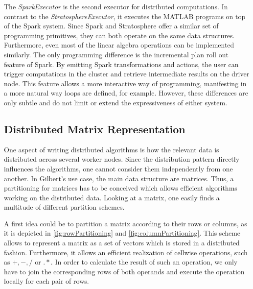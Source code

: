 The \emph{SparkExecutor} is the second executor for distributed computations.
In contrast to the \emph{StratosphereExecutor}, it executes the MATLAB programs on top of the Spark system.
Since Spark and Stratosphere offer a similar set of programming primitives, they can both operate on the same data structures.
Furthermore, even most of the linear algebra operations can be implemented similarly.
The only programming difference is the incremental plan roll out feature of Spark.
By emitting Spark transformations and actions, the user can trigger computations in the cluster and retrieve intermediate results on the driver node.
This feature allows a more interactive way of programming, manifesting in a more natural way loops are defined, for example.
However, these differences are only subtle and do not limit or extend the expressiveness of either system.

\subsection{Distributed Matrix Representation}
\label{sec:DistributedMatrixRepresentation}

One aspect of writing distributed algorithms is how the relevant data is distributed across several worker nodes.
Since the distribution pattern directly influences the algorithms, one cannot consider them independently from one another.
In Gilbert's use case, the main data structure are matrices.
Thus, a partitioning for matrices has to be conceived which allows efficient algorithms working on the distributed data.
Looking at a matrix, one easily finds a multitude of different partition schemes.

A first idea could be to partition a matrix according to their rows or columns, as it is depicted in \cref{fig:rowPartitioning} and \cref{fig:columnPartitioning}.
This scheme allows to represent a matrix as a set of vectors which is stored in a distributed fashion.
Furthermore, it allows an efficient realization of cellwise operations, such as $+,-,/$ or $.*$.
In order to calculate the result of such an operation, we only have to join the corresponding rows of both operands and execute the operation locally for each pair of rows.

